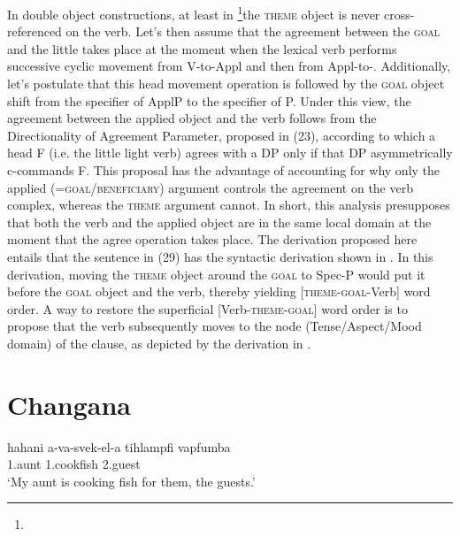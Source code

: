\documentclass[output=paper]{langsci/langscibook}
\begin{document}
In double object constructions, at least in \footnote{}\textstyleFontepargpadroi{ }the \textsc{theme} object is never cross-referenced on the verb. Let’s then assume that the agreement between the \textsc{goal} and the little  takes place at the moment when the lexical verb performs successive cyclic movement from V-to-Appl and then from Appl-to-. Additionally, let’s postulate that this head movement operation is followed by the \textsc{goal} object shift from the specifier of ApplP to the specifier of P. Under this view, the agreement between the applied object and the verb follows from the Directionality of Agreement Parameter, proposed in (23), according to which a head F (i.e. the little light verb) agrees with a DP only if that DP asymmetrically c-commands F. This proposal has the advantage of accounting for why only the applied (=\textsc{goal/beneficiary}) argument controls the agreement on the verb complex, whereas the \textsc{theme} argument cannot. In short, this analysis presupposes that both the verb and the applied object are in the same local domain at the moment that the agree operation takes place. The derivation proposed here entails that the sentence in (29) has the syntactic derivation shown in . In this derivation, moving the \textsc{theme} object around the \textsc{goal} to Spec-P would put it before the \textsc{goal} object and the verb, thereby yielding [\textsc{theme-goal}{}-Verb] word order. A way to restore the superficial [Verb-\textsc{theme-goal}] word order is to propose that the verb subsequently moves to the  node (Tense/Aspect/Mood domain) of the clause, as depicted by the derivation in .

\chapter[Changana]{Changana}
\label{bkm:Ref455885923}\gll hahani       a-va-svek-el-a                        tihlampfi      vapfumba\\
     1.aunt        1.\textstyleFontepargpadroi{{}-}cook\textstyleFontepargpadroi{{}-}\textstyleFontepargpadroi{{}-}fish          2.guest\\
\glt ‘My aunt is cooking fish for them, the guests.’
\z
\end{document}
